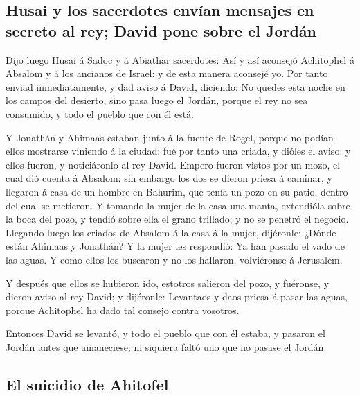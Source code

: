 \hypertarget{husai-y-los-sacerdotes-envuxedan-mensajes-en-secreto-al-rey-david-pone-sobre-el-jorduxe1n}{%
\subsection{Husai y los sacerdotes envían mensajes en secreto al rey;
David pone sobre el
Jordán}\label{husai-y-los-sacerdotes-envuxedan-mensajes-en-secreto-al-rey-david-pone-sobre-el-jorduxe1n}}

 Dijo luego Husai á Sadoc y á Abiathar sacerdotes: Así y
así aconsejó Achitophel á Absalom y á los ancianos de Israel: y de esta
manera aconsejé yo.  Por tanto enviad inmediatamente, y
dad aviso á David, diciendo: No quedes esta noche en los campos del
desierto, sino pasa luego el Jordán, porque el rey no sea consumido, y
todo el pueblo que con él está.

 Y Jonathán y Ahimaas estaban junto á la fuente de Rogel,
porque no podían ellos mostrarse viniendo á la ciudad; fué por tanto una
criada, y dióles el aviso: y ellos fueron, y noticiáronlo al rey David.
 Empero fueron vistos por un mozo, el cual dió cuenta á
Absalom: sin embargo los dos se dieron priesa á caminar, y llegaron á
casa de un hombre en Bahurim, que tenía un pozo en su patio, dentro del
cual se metieron.  Y tomando la mujer de la casa una
manta, extendióla sobre la boca del pozo, y tendió sobre ella el grano
trillado; y no se penetró el negocio.  Llegando luego los
criados de Absalom á la casa á la mujer, dijéronle: ¿Dónde están Ahimaas
y Jonathán? Y la mujer les respondió: Ya han pasado el vado de las
aguas. Y como ellos los buscaron y no los hallaron, volviéronse á
Jerusalem.

 Y después que ellos se hubieron ido, estotros salieron
del pozo, y fuéronse, y dieron aviso al rey David; y dijéronle:
Levantaos y daos priesa á pasar las aguas, porque Achitophel ha dado tal
consejo contra vosotros.

 Entonces David se levantó, y todo el pueblo que con él
estaba, y pasaron el Jordán antes que amaneciese; ni siquiera faltó uno
que no pasase el Jordán.

\hypertarget{el-suicidio-de-ahitofel}{%
\subsection{El suicidio de Ahitofel}\label{el-suicidio-de-ahitofel}}

